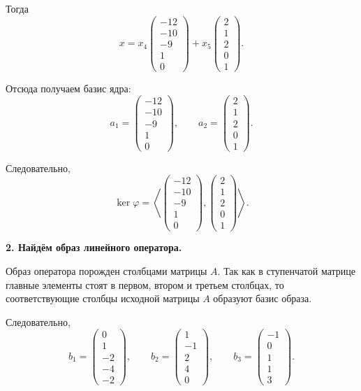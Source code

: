 Тогда
\[
x=
x_4
\begin{pmatrix}
-12\\
-10\\
-9\\
1\\
0
\end{pmatrix}
+
x_5
\begin{pmatrix}
2\\
1\\
2\\
0\\
1
\end{pmatrix}.
\]

Отсюда получаем базис ядра:
\[
a_1=
\begin{pmatrix}
-12\\
-10\\
-9\\
1\\
0
\end{pmatrix},
\qquad
a_2=
\begin{pmatrix}
2\\
1\\
2\\
0\\
1
\end{pmatrix}.
\]

Следовательно,
\[
\ker\varphi=
\left\langle
\begin{pmatrix}
-12\\
-10\\
-9\\
1\\
0
\end{pmatrix},
\begin{pmatrix}
2\\
1\\
2\\
0\\
1
\end{pmatrix}
\right\rangle.
\]

\bigskip

\textbf{2. Найдём образ линейного оператора.}

Образ оператора порожден столбцами матрицы $A$.
Так как в ступенчатой матрице главные элементы стоят в первом, втором и третьем столбцах, то соответствующие столбцы исходной матрицы $A$ образуют базис образа.

Следовательно,
\[
b_1=
\begin{pmatrix}
0\\
1\\
-2\\
-4\\
-2
\end{pmatrix},
\qquad
b_2=
\begin{pmatrix}
1\\
-1\\
2\\
4\\
0
\end{pmatrix},
\qquad
b_3=
\begin{pmatrix}
-1\\
0\\
1\\
1\\
3
\end{pmatrix}.
\]

